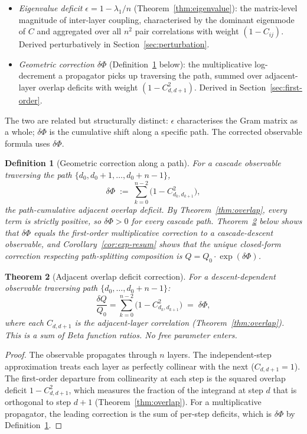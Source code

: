 \documentclass[11pt,a4paper]{article}
\newtheorem{theorem}{Theorem}[section]
\newtheorem{definition}[theorem]{Definition}
\begin{document}
\begin{itemize}
\item \emph{Eigenvalue deficit $\epsilon = 1 - \lambda_1/n$} (Theorem~\ref{thm:eigenvalue}): the matrix-level magnitude of inter-layer coupling, characterised by the dominant eigenmode of $C$ and aggregated over all $n^2$ pair correlations with weight $(1-C_{ij})$. Derived perturbatively in Section~\ref{sec:perturbation}.
\item \emph{Geometric correction $\delta\Phi$} (Definition~\ref{def:delta-phi} below): the multiplicative log-decrement a propagator picks up traversing the path, summed over adjacent-layer overlap deficits with weight $(1-C^2_{d,d+1})$. Derived in Section~\ref{sec:first-order}.
\end{itemize}

The two are related but structurally distinct: $\epsilon$ characterises the Gram matrix as a whole; $\delta\Phi$ is the cumulative shift along a specific path. The corrected observable formula uses $\delta\Phi$.

\begin{definition}[Geometric correction along a path]\label{def:delta-phi}
For a cascade observable traversing the path $\{d_0, d_0+1, \ldots, d_0+n-1\}$,
\[
\delta\Phi \;:=\; \sum_{k=0}^{n-2}\bigl(1 - C^2_{d_k, d_{k+1}}\bigr),
\]
the path-cumulative adjacent overlap deficit. By Theorem~\ref{thm:overlap}, every term is strictly positive, so $\delta\Phi > 0$ for every cascade path. Theorem~\ref{thm:first-order} below shows that $\delta\Phi$ equals the first-order multiplicative correction to a cascade-descent observable, and Corollary~\ref{cor:exp-resum} shows that the unique closed-form correction respecting path-splitting composition is $Q = Q_0 \cdot \exp(\delta\Phi)$.
\end{definition}

\begin{theorem}[Adjacent overlap deficit correction]\label{thm:first-order}
For a descent-dependent observable traversing path $\{d_0,\ldots,d_0+n-1\}$:
\begin{equation}\label{eq:first-order}
\frac{\delta Q}{Q_0} = \sum_{k=0}^{n-2}\bigl(1 - C_{d_k,d_{k+1}}^2\bigr) \;=\; \delta\Phi,
\end{equation}
where each $C_{d,d+1}$ is the adjacent-layer correlation (Theorem~\ref{thm:overlap}).
This is a sum of Beta function ratios. No free parameter enters.
\end{theorem}

\begin{proof}
The observable propagates through $n$ layers. The independent-step approximation treats each layer as perfectly collinear with the next ($C_{d,d+1}=1$). The first-order departure from collinearity at each step is the squared overlap deficit $1-C_{d,d+1}^2$, which measures the fraction of the integrand at step $d$ that is orthogonal to step $d+1$ (Theorem~\ref{thm:overlap}). For a multiplicative propagator, the leading correction is the sum of per-step deficits, which is $\delta\Phi$ by Definition~\ref{def:delta-phi}.
\end{proof}
\end{document}
